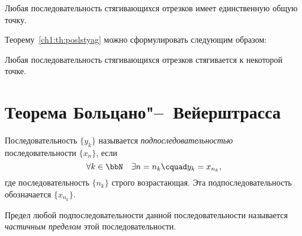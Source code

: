 \begin{thm}
\label{ch1:th:poslstyag}
Любая последовательность стягивающихся отрезков имеет единственную общую точку.
\end{thm}

Теорему~\ref{ch1:th:poslstyag} можно сформулировать следующим образом: 
\begin{thmn}
Любая последовательность стягивающихся отрезков стягивается к некоторой точке.
\end{thmn}

\section{Теорема Больцано"--~Вейерштрасса}
\begin{defn}
Последовательность $\{y_k\}$ называется \textit{подпоследовательностью} последовательности $\{x_n\}$, если 
$$
\forall k \in \bbN \quad \exists n=n_k\cquad y_k=x_{n_k},
$$
где последовательность $\{n_k\}$ строго возрастающая. Эта подпоследовательность обозначается $\{x_{n_k}\}$.
\end{defn}

\begin{defn}
Предел любой подпоследовательности данной последовательности называется \textit{частичным пределом} этой последовательности.
\end{defn}

